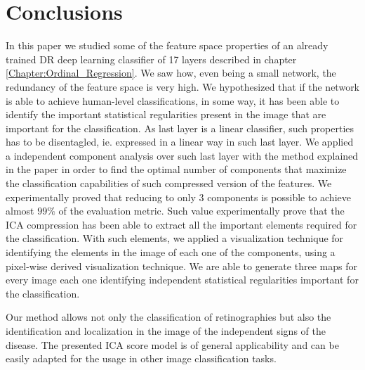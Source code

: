 \section{Conclusions}\label{sec:conclusions}

In this paper we studied some of the feature space properties of an already trained DR deep learning classifier of 17 layers described in chapter \ref{Chapter:Ordinal_Regression}. We saw how, even being a small network, the redundancy of the feature space is very high. We hypothesized that if the network is able to achieve human-level classifications, in some way, it has been able to identify the important statistical regularities present in the image that are important for the classification. As last layer is a linear classifier, such properties has to be disentagled, ie. expressed in a linear way in such last layer. We applied a independent component analysis over such last layer with the method explained in the paper in order to find the optimal number of components that maximize the classification capabilities of such compressed version of the features. We experimentally proved that reducing to only 3 components is possible to achieve almost $99\%$ of the evaluation metric. Such value experimentally prove that the ICA compression has been able to extract all the important elements required for the classification. With such elements, we applied a visualization technique for identifying the elements in the image of each one of the components, using a pixel-wise derived visualization technique. We are able to generate three maps for every image each one identifying independent statistical regularities important for the classification.

Our method allows not only the classification of retinographies but also the identification and localization in the image of the independent signs of the disease. The presented ICA score model is of general applicability and can be easily adapted for the usage in other image classification tasks.
